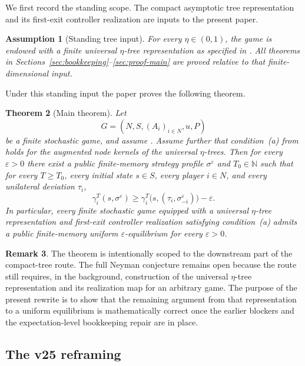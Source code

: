 \documentclass[12pt]{article}
\newtheorem{theorem}{Theorem}[section]
\newtheorem{assumption}[theorem]{Assumption}
\theoremstyle{definition}
\newtheorem{remark}[theorem]{Remark}
\newcommand{\eps}{\varepsilon}
\newcommand{\N}{\mathbb{N}}
\newcommand{\1}{\mathbf{1}}
\begin{document}
We first record the standing scope. The compact asymptotic tree representation and
its first-exit controller realization are inputs to the present paper.

\begin{assumption}[Standing tree input]
\label{ass:tree-input}
For every $\eta\in(0,1)$, the game is endowed with a finite universal
$\eta$-tree representation as specified in
. All theorems in
Sections~\ref{sec:bookkeeping}--\ref{sec:proof-main} are proved relative to that
finite-dimensional input.
\end{assumption}

Under this standing input the paper proves the following theorem.

\begin{theorem}[Main theorem]
\label{thm:main}
Let
\[
G=(N,S,(A_i)_{i\in N},u,P)
\]
be a finite stochastic game, and assume . Assume further
that condition~\textnormal{(a)} from  holds for the augmented node
kernels of the universal $\eta$-trees. Then for every $\eps>0$ there exist a
public finite-memory strategy profile $\sigma^\eps$ and $T_0\in\N$ such that for
every $T\ge T_0$, every initial state $s\in S$, every player $i\in N$, and every
unilateral deviation $\tau_i$,
\[
\gamma_i^T(s,\sigma^\eps)
\ge
\gamma_i^T\bigl(s,(\tau_i,\sigma^\eps_{-i})\bigr)-\eps.
\]
In particular, every finite stochastic game equipped with a universal
$\eta$-tree representation and first-exit controller realization satisfying
condition~\textnormal{(a)} admits a public finite-memory uniform
$\eps$-equilibrium for every $\eps>0$.
\end{theorem}

\begin{remark}
The theorem is intentionally scoped to the downstream part of the compact-tree
route. The full Neyman conjecture remains open because the route still requires,
in the background, construction of the universal $\eta$-tree representation and
its realization map for an arbitrary game. The purpose of the present rewrite is
to show that the remaining argument from that representation to a uniform
equilibrium is mathematically correct once the earlier blockers and the
expectation-level bookkeeping repair are in place.
\end{remark}




\subsection{The v25 reframing}
\end{document}
